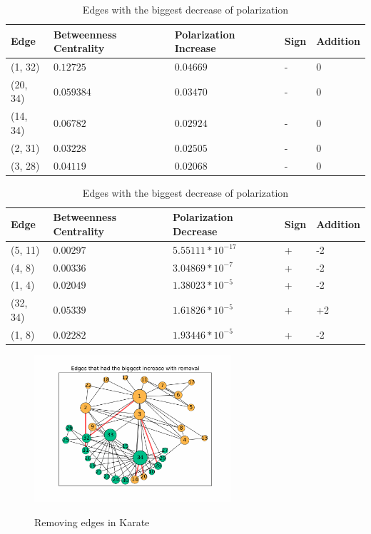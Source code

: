 \begin{table}[H]
 \centering
 \caption{Edges with the biggest increase of polarization}
 \label{tab:edgesLargest}
 \begin{tabular}{| l || l | l | l | l |}
 \hline
  Edge & Betweenness Centrality & Polarization Increase & Sign & Addition\\
  \hline
  \hline
  (1, 32) & $0.12725$ & $0.04669$ & - &  0\\
  \hline
  (20, 34) & $0.059384$ & $0.03470$ & - &  0\\
  \hline
  (14, 34) & $0.06782$ & $0.02924$ & - &  0\\
  \hline
  (2, 31) & $0.03228$ & $0.02505$ & - &  0\\
  \hline
  (3, 28) & $0.04119$ & $0.02068$ & - &  0\\
  \hline
 \end{tabular}
  
 \caption{Edges with the biggest decrease of polarization }
 \label{tab:edgesLargest}
 \begin{tabular}{| l || l | l | l | l |}
 \hline
  Edge & Betweenness Centrality & Polarization Decrease & Sign & Addition\\
  \hline
  \hline
  (5, 11) & $0.00297$ & $5.55111*10^{-17}$ & + &  -2\\
  \hline
  (4, 8) & $0.00336$ & $3.04869*10^{-7}$ & + &  -2\\
  \hline
  (1, 4) & $0.02049$ & $1.38023*10^{-5}$ & + &  -2\\
  \hline
  (32, 34) & $0.05339$ & $1.61826*10^{-5}$ & + &  +2\\
  \hline
  (1, 8) & $0.02282$ & $1.93446*10^{-5}$ & + &  -2\\
  \hline
  \hline
 \end{tabular}
\end{table}

\begin{figure}[H]
	\centering
	\includegraphics[width=0.65\textwidth]{Figures/karate_increase}
	\label{fig:karate_increase}
	\caption{Removing edges in Karate}
\end{figure}

